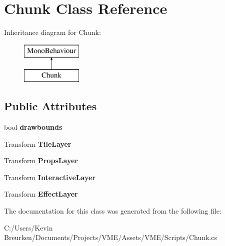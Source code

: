 \hypertarget{class_chunk}{}\section{Chunk Class Reference}
\label{class_chunk}
Inheritance diagram for Chunk\+:\begin{figure}[H]
\begin{center}
\leavevmode
\includegraphics[height=2.000000cm]{class_chunk}
\end{center}
\end{figure}
\subsection*{Public Attributes}
\begin{DoxyCompactItemize}
\item 
bool {\bfseries drawbounds}\hypertarget{class_chunk_aa46dfc546e0e24f2a8a0444baef51bba}{}\label{class_chunk_aa46dfc546e0e24f2a8a0444baef51bba}

\item 
Transform {\bfseries Tile\+Layer}\hypertarget{class_chunk_ab506fb9adf7c1dc3de9421dec3187fa5}{}\label{class_chunk_ab506fb9adf7c1dc3de9421dec3187fa5}

\item 
Transform {\bfseries Props\+Layer}\hypertarget{class_chunk_a40fe7f30cc1a82fcddb772ad528c8f3e}{}\label{class_chunk_a40fe7f30cc1a82fcddb772ad528c8f3e}

\item 
Transform {\bfseries Interactive\+Layer}\hypertarget{class_chunk_af3445842a83849116e7cd9d7484c0e76}{}\label{class_chunk_af3445842a83849116e7cd9d7484c0e76}

\item 
Transform {\bfseries Effect\+Layer}\hypertarget{class_chunk_a6e1204c82272a460e0ad1b9a6a3bb299}{}\label{class_chunk_a6e1204c82272a460e0ad1b9a6a3bb299}

\end{DoxyCompactItemize}


The documentation for this class was generated from the following file\+:\begin{DoxyCompactItemize}
\item 
C\+:/\+Users/\+Kevin Breurken/\+Documents/\+Projects/\+V\+M\+E/\+Assets/\+V\+M\+E/\+Scripts/Chunk.\+cs\end{DoxyCompactItemize}
